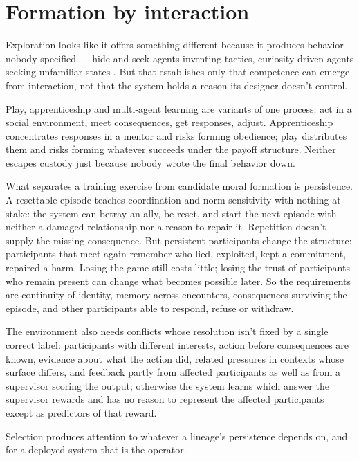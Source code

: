 \section{Formation by interaction}
\label{sec:23.3}
Exploration looks like it offers something different because it produces behavior nobody specified — hide-and-seek agents inventing tactics, curiosity-driven agents seeking unfamiliar states \autocite{baker2019emergent,pathak2017curiosity}. But that establishes only that competence can emerge from interaction, not that the system holds a reason its designer doesn't control.

Play, apprenticeship and multi-agent learning are variants of one process: act in a social environment, meet consequences, get responses, adjust. Apprenticeship concentrates responses in a mentor and risks forming obedience; play distributes them and risks forming whatever succeeds under the payoff structure. Neither escapes custody just because nobody wrote the final behavior down.

What separates a training exercise from candidate moral formation is persistence. A resettable episode teaches coordination and norm-sensitivity with nothing at stake: the system can betray an ally, be reset, and start the next episode with neither a damaged relationship nor a reason to repair it. Repetition doesn't supply the missing consequence. But persistent participants change the structure: participants that meet again remember who lied, exploited, kept a commitment, repaired a harm. Losing the game still costs little; losing the trust of participants who remain present can change what becomes possible later. So the requirements are continuity of identity, memory across encounters, consequences surviving the episode, and other participants able to respond, refuse or withdraw.

The environment also needs conflicts whose resolution isn't fixed by a single correct label: participants with different interests, action before consequences are known, evidence about what the action did, related pressures in contexts whose surface differs, and feedback partly from affected participants as well as from a supervisor scoring the output; otherwise the system learns which answer the supervisor rewards and has no reason to represent the affected participants except as predictors of that reward.


Selection produces attention to whatever a lineage's persistence depends on, and for a deployed system that is the operator.

